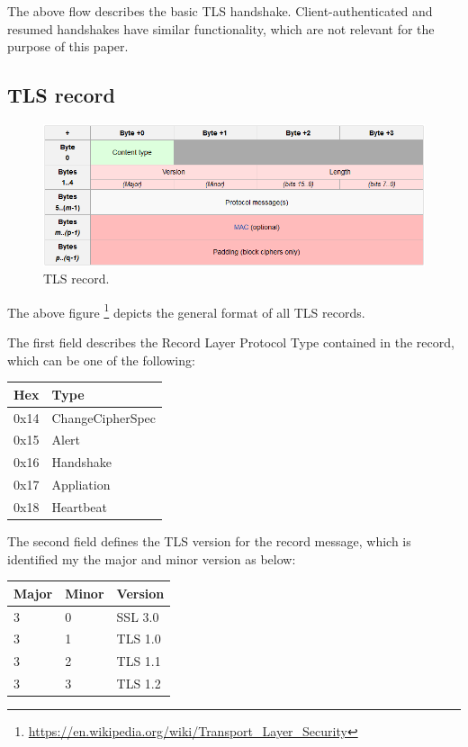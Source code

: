 The above flow describes the basic TLS handshake. Client-authenticated and resumed handshakes have similar functionality, which are not relevant for the purpose of this paper.

\subsection{TLS record}

\begin{figure}[H] \caption{TLS record.} \centering \includegraphics[width=1\textwidth]{diagrams/tls_record.png}\end{figure}

The above figure \footnote{\url{https://en.wikipedia.org/wiki/Transport_Layer_Security}} depicts the general format of all TLS records.

The first field describes the Record Layer Protocol Type contained in the record, which can be one of the following:

\begin{table}[H]
    \centering
    \begin{tabular}{ | l | l | }
    \hline
    \textbf{Hex} & \textbf{Type} \\
    \hline
    0x14 & ChangeCipherSpec \\
    0x15 & Alert \\
    0x16 & Handshake \\
    0x17 & Appliation \\
    0x18 & Heartbeat \\
    \hline
    \end{tabular}
\end{table}

The second field defines the TLS version for the record message, which is identified my the major and minor version as below:

\begin{table}[H]
    \centering
    \begin{tabular}{ | l | l | l | }
    \hline
    \textbf{Major} & \textbf{Minor} & \textbf{Version} \\
    \hline
    3 & 0 & SSL 3.0 \\
    3 & 1 & TLS 1.0 \\
    3 & 2 & TLS 1.1 \\
    3 & 3 & TLS 1.2 \\
    \hline
    \end{tabular}
\end{table}

